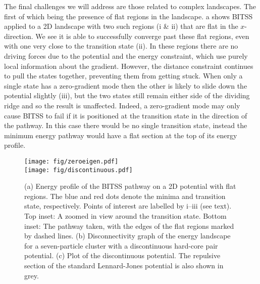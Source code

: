 \documentclass[aps,prl,twocolumn,groupedaddress]{revtex4}
\begin{document}
\topic The final challenges we will address are those related to complex landscapes.
The first of which being the presence of flat regions in the landscape.
a shows BITSS applied to a 2D landscape with two such regions (i \& ii) that are flat in the $x$-direction.
We see it is able to successfully converge past these flat regions, even with one very close to the transition state (ii).
In these regions there are no driving forces due to the potential and the energy constraint, which use purely local information about the gradient.
However, the distance constraint continues to pull the states together, preventing them from getting stuck.
When only a single state has a zero-gradient mode then the other is likely to slide down the potential slightly (iii), but the two states still remain either side of the dividing ridge and so the result is unaffected.
Indeed, a zero-gradient mode may only cause BITSS to fail if it is positioned at the transition state in the direction of the pathway.
In this case there would be no single transition state, instead the minimum energy pathway would have a flat section at the top of its energy profile.

\begin{figure}[tb]
  \texttt{[image: fig/zeroeigen.pdf]}\\
  \texttt{[image: fig/discontinuous.pdf]}
  \caption{\label{fig:flatdiscontinuous}
    (a) Energy profile of the BITSS pathway on a 2D potential with flat regions.
        The blue and red dots denote the minima and transition state, respectively.
        Points of interest are labelled by i--iii (see text).
        Top inset: A zoomed in view around the transition state.
        Bottom inset: The pathway taken, with the edges of the flat regions marked by dashed lines.
    (b) Disconnectivity graph of the energy landscape for a seven-particle cluster with a discontinuous hard-core pair potential.
    (c) Plot of the discontinuous potential.
        The repulsive section of the standard Lennard-Jones potential is also shown in grey.
  }
\end{figure}
\end{document}
